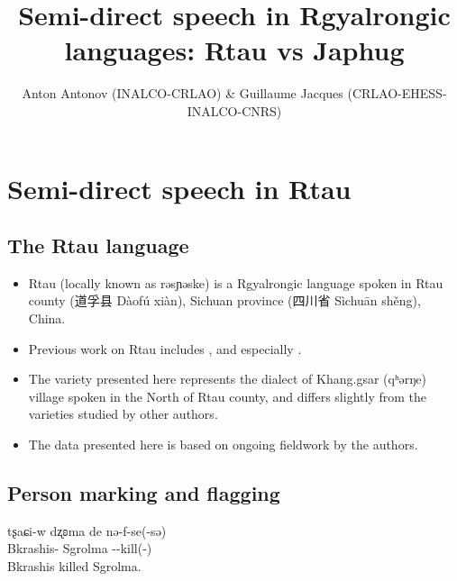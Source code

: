 \documentclass[oneside,a4paper,11pt]{article}
\title{Semi-direct speech in Rgyalrongic languages: Rtau vs Japhug}
\author{Anton Antonov (INALCO-CRLAO)  \& Guillaume Jacques (CRLAO-EHESS-INALCO-CNRS)}
\newcommand{\ipa}[1]{{\phon #1}} %
\newcommand{\zh}[1]{{\cn #1}}
\newcommand{\ipapl}[1]{{\phondroit #1}}
\begin{document}
 
\maketitle





\section{Semi-direct speech in Rtau}

\subsection{The Rtau language}


\begin{itemize}
 \item  Rtau (locally known as \ipa{rəsɲəske}) is a Rgyalrongic language spoken in Rtau county (\zh{道孚县} Dàofú xiàn), Sichuan province (\zh{四川省} Sìchuān shěng), China.

 
\end{itemize}
 

\begin{itemize}
 \item Previous work on Rtau includes \citet{huangbf91daofu}, \citet{jackson07shangzhai} and especially \citet{sun13gexi}.
\item The variety presented here represents the dialect of Khang.gsar (\ipa{qʰərŋe}) village spoken in the North of Rtau county, and differs slightly from the varieties studied by other authors.

\item The  data presented here is based on ongoing fieldwork by the authors.


\end{itemize}




\subsection{Person marking and flagging}

\begin{exe}
\ex \label{ex:np3}
\gll
	\ipa{tʂaɕi-w} \ipapl{dʐʚma} 	\ipapl{de} \ipapl{nə-f-se(-sə)} \\
	{Bkrashis-\erg} Sgrolma {\dem} {\prf-\inv-kill(-\evid)}\\ 
	\glt Bkrashis killed Sgrolma.
\end{exe}
\end{document}
